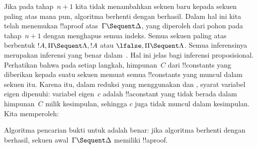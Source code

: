 \documentclass[../../../include/open-logic-section]{subfiles}
\begin{document}
Jika pada tahap~$n+1$ kita tidak menambahkan sekuen baru kepada sekuen
paling atas mana pun, algoritma berhenti dengan berhasil. Dalam hal ini
kita telah menemukan !!a{proof} atas~$\Gamma \Sequent \Delta$, yang
diperoleh dari pohon pada tahap~$n+1$ dengan menghapus semua indeks.
Semua sekuen paling atas berbentuk $!A, \Pi \Sequent \Lambda, !A$ atau
$\lfalse, \Pi \Sequent \Lambda$. Semua inferensinya merupakan inferensi
yang benar dalam~. Hal ini jelas bagi inferensi proposisional.
Perhatikan bahwa pada setiap langkah, himpunan~$C$ dari !!{constant}s
yang diberikan kepada suatu sekuen memuat semua !!{constant}s yang
muncul dalam sekuen itu.
Karena itu, dalam reduksi yang menggunakan \LeftR{\lexists} dan
\RightR{\lforall}, syarat variabel eigen dipenuhi: variabel eigen~$c$
adalah !!a{constant} yang tidak berada dalam himpunan~$C$ milik
kesimpulan, sehingga $c$ juga tidak muncul dalam kesimpulan. Kita
memperoleh:

\begin{prop}
Algoritma pencarian bukti untuk  adalah benar: jika algoritma
berhenti dengan berhasil, sekuen awal~$\Gamma \Sequent \Delta$ memiliki
!!a{proof}.
\end{prop}
\end{document}

